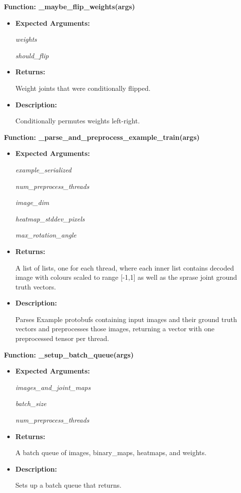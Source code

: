\documentclass{scrreprt}
\begin{document}
\textbf{Function: \_maybe\_flip\_weights(args)}
\begin{itemize}
    \item \textbf{Expected Arguments:}

            \quad\textit{weights}

            \quad\textit{should\_flip}

    \item \textbf{Returns:}

            Weight joints that were conditionally flipped.

    \item \textbf{Description:}

            Conditionally permutes weights left-right.

\end{itemize}

\textbf{Function: \_parse\_and\_preprocess\_example\_train(args)}
\begin{itemize}
    \item \textbf{Expected Arguments:}

            \quad\textit{example\_serialized}

            \quad\textit{num\_preprocess\_threads}

            \quad\textit{image\_dim}

            \quad\textit{heatmap\_stddev\_pixels}

            \quad\textit{max\_rotation\_angle}

    \item \textbf{Returns:}

            A list of lists, one for each thread, where each inner list contains decoded image with colours scaled to range [-1,1] as well as the sprase joint ground truth vectors.

    \item \textbf{Description:}

            Parses Example protobufs containing input images and their ground truth vectors and preprocesses those images, returning a vector with one preprocessed tensor per thread.

\end{itemize}

\textbf{Function: \_setup\_batch\_queue(args)}
\begin{itemize}
    \item \textbf{Expected Arguments:}

            \quad\textit{images\_and\_joint\_maps}

            \quad\textit{batch\_size}

            \quad\textit{num\_preprocess\_threads}

    \item \textbf{Returns:}

            A batch queue of images, binary\_maps, heatmaps, and weights.

    \item \textbf{Description:}

            Sets up a batch queue that returns.

\end{itemize}
\end{document}
